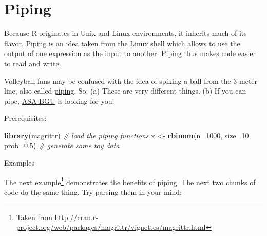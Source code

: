 \documentclass[]{book}
\newenvironment{Shaded}{\begin{snugshade}}{\end{snugshade}}
\newcommand{\KeywordTok}[1]{\textcolor[rgb]{0.13,0.29,0.53}{\textbf{#1}}}
\newcommand{\DataTypeTok}[1]{\textcolor[rgb]{0.13,0.29,0.53}{#1}}
\newcommand{\DecValTok}[1]{\textcolor[rgb]{0.00,0.00,0.81}{#1}}
\newcommand{\FloatTok}[1]{\textcolor[rgb]{0.00,0.00,0.81}{#1}}
\newcommand{\StringTok}[1]{\textcolor[rgb]{0.31,0.60,0.02}{#1}}
\newcommand{\CommentTok}[1]{\textcolor[rgb]{0.56,0.35,0.01}{\textit{#1}}}
\newcommand{\OperatorTok}[1]{\textcolor[rgb]{0.81,0.36,0.00}{\textbf{#1}}}
\newcommand{\NormalTok}[1]{#1}
\theoremstyle{definition}
\theoremstyle{definition}
\theoremstyle{definition}
\theoremstyle{remark}
\let\BeginKnitrBlock\begin \let\EndKnitrBlock\end
\begin{document}
\section{Piping}\label{piping}

Because R originates in Unix and Linux environments, it inherits much of
its flavor.
\href{http://ryanstutorials.net/linuxtutorial/piping.php}{Piping} is an
idea taken from the Linux shell which allows to use the output of one
expression as the input to another. Piping thus makes code easier to
read and write.

\BeginKnitrBlock{remark}
{}Volleyball fans may be confused with the idea
of spiking a ball from the 3-meter line, also called
\href{https://www.youtube.com/watch?v=GWW15Nr1lQM}{piping}. So: (a)
These are very different things. (b) If you can pipe,
\href{http://in.bgu.ac.il/sport/Pages/asa.aspx}{ASA-BGU} is looking for
you!
\EndKnitrBlock{remark}

Prerequisites:

\begin{Shaded}
\begin{Highlighting}[]
\KeywordTok{library}\NormalTok{(magrittr) }\CommentTok{# load the piping functions}
\NormalTok{x <-}\StringTok{ }\KeywordTok{rbinom}\NormalTok{(}\DataTypeTok{n=}\DecValTok{1000}\NormalTok{, }\DataTypeTok{size=}\DecValTok{10}\NormalTok{, }\DataTypeTok{prob=}\FloatTok{0.5}\NormalTok{) }\CommentTok{# generate some toy data}
\end{Highlighting}
\end{Shaded}

Examples

\begin{Shaded}
\end{Shaded}

The next example\footnote{Taken from
  \url{http://cran.r-project.org/web/packages/magrittr/vignettes/magrittr.html}}
demonstrates the benefits of piping. The next two chunks of code do the
same thing. Try parsing them in your mind:
\end{document}
